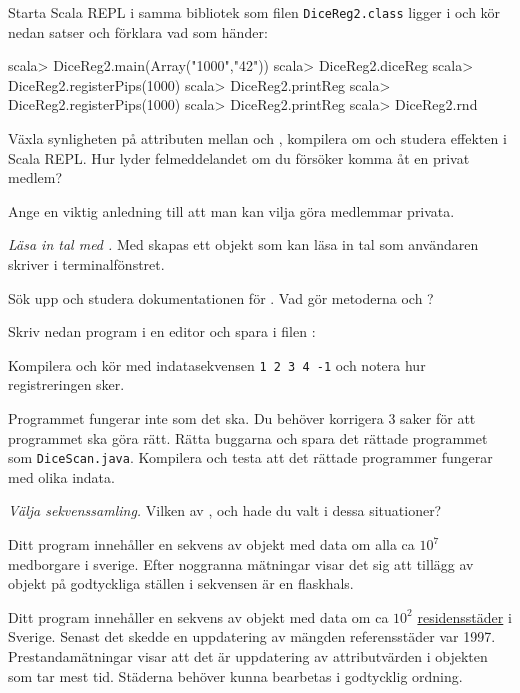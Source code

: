 \Subtask Starta Scala REPL i samma bibliotek som filen \texttt{DiceReg2.class} ligger i och kör nedan satser och förklara vad som händer:
\begin{REPL}
scala> DiceReg2.main(Array("1000","42"))
scala> DiceReg2.diceReg
scala> DiceReg2.registerPips(1000)
scala> DiceReg2.printReg
scala> DiceReg2.registerPips(1000)
scala> DiceReg2.printReg
scala> DiceReg2.rnd
\end{REPL}

\Subtask Växla synligheten på attributen mellan  och , kompilera om och studera effekten i Scala REPL. Hur lyder felmeddelandet om du försöker komma åt en privat medlem?

\Subtask\Pen Ange en viktig anledning till att man kan vilja göra medlemmar privata.



\Task \emph{Läsa in tal med .} Med  skapas ett objekt som kan läsa in tal som användaren skriver i terminalfönstret.

\Subtask Sök upp och studera dokumentationen för . Vad gör metoderna  och ?

\Subtask Skriv nedan program i en editor och spara i filen :


\Subtask Kompilera och kör med indatasekvensen \texttt{1 2 3 4 -1} och notera hur registreringen sker.

\Subtask Programmet fungerar inte som det ska. Du behöver korrigera 3 saker för att programmet ska göra rätt. Rätta buggarna och spara det rättade programmet som \texttt{DiceScan.java}. Kompilera och testa att det rättade programmer fungerar med olika indata.


\Task\Pen \emph{Välja sekvenssamling.} Vilken av ,  och  hade du valt i dessa situationer?		
	
\Subtask Ditt program innehåller en sekvens av objekt med data om alla ca $10^7$ medborgare i sverige. Efter noggranna mätningar visar det sig att tillägg av objekt på godtyckliga ställen i sekvensen är en flaskhals.		
		
\Subtask Ditt program innehåller en sekvens av objekt med data om ca $10^2$ \href{https://sv.wikipedia.org/wiki/Residensstad#Sverige}{residensstäder} i Sverige. Senast det skedde en uppdatering av mängden referensstäder var 1997. Prestandamätningar visar att det är uppdatering av attributvärden i objekten som tar mest tid. Städerna behöver kunna bearbetas i godtycklig ordning.		
		
